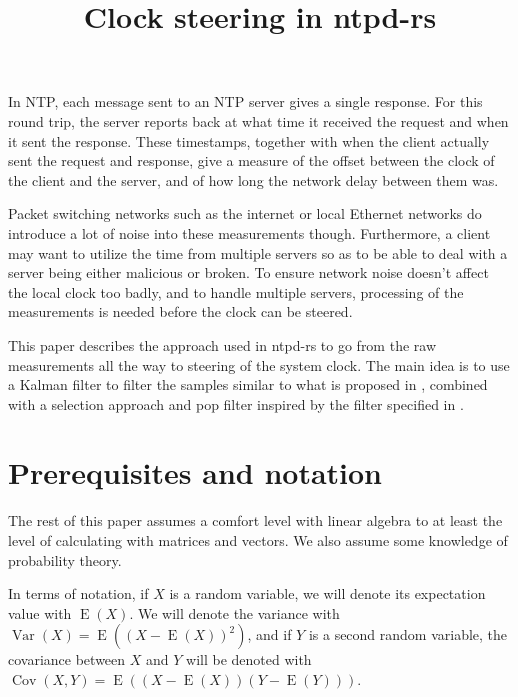 \documentclass{article}
\title{Clock steering in ntpd-rs}
\DeclareMathOperator{\Var}{Var}
\DeclareMathOperator{\Cov}{Cov}
\DeclareMathOperator{\E}{E}
\begin{document}
\maketitle

In NTP, each message sent to an NTP server gives a single response. For this round trip, the server reports back at what time it received the request and when it sent the response. These timestamps, together with when the client actually sent the request and response, give a measure of the offset between the clock of the client and the server, and of how long the network delay between them was.

Packet switching networks such as the internet or local Ethernet networks do introduce a lot of noise into these measurements though. Furthermore, a client may want to utilize the time from multiple servers so as to be able to deal with a server being either malicious or broken. To ensure network noise doesn't affect the local clock too badly, and to handle multiple servers, processing of the measurements is needed before the clock can be steered.

This paper describes the approach used in ntpd-rs to go from the raw measurements all the way to steering of the system clock. The main idea is to use a Kalman filter to filter the samples similar to what is proposed in \cite{giada2015}, combined with a selection approach and pop filter inspired by the filter specified in \cite{rfc5905}.

\section{Prerequisites and notation}

The rest of this paper assumes a comfort level with linear algebra to at least the level of calculating with matrices and vectors. We also assume some knowledge of probability theory.

In terms of notation, if $X$ is a random variable, we will denote its expectation value with $\E(X)$. We will denote the variance with $\Var(X) = \E((X-\E(X))^2)$, and if $Y$ is a second random variable, the covariance between $X$ and $Y$ will be denoted with $\Cov(X,Y) = \E((X-\E(X))(Y-\E(Y)))$.
\end{document}
